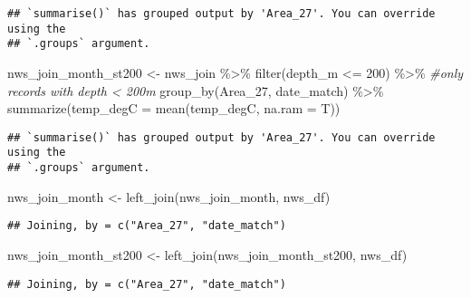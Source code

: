 \documentclass[
]{article}
\newenvironment{Shaded}{\begin{snugshade}}{\end{snugshade}}
\newcommand{\AttributeTok}[1]{\textcolor[rgb]{0.77,0.63,0.00}{#1}}
\newcommand{\CommentTok}[1]{\textcolor[rgb]{0.56,0.35,0.01}{\textit{#1}}}
\newcommand{\DecValTok}[1]{\textcolor[rgb]{0.00,0.00,0.81}{#1}}
\newcommand{\FunctionTok}[1]{\textcolor[rgb]{0.00,0.00,0.00}{#1}}
\newcommand{\NormalTok}[1]{#1}
\newcommand{\OtherTok}[1]{\textcolor[rgb]{0.56,0.35,0.01}{#1}}
\newcommand{\SpecialCharTok}[1]{\textcolor[rgb]{0.00,0.00,0.00}{#1}}
\begin{document}
\begin{verbatim}
## `summarise()` has grouped output by 'Area_27'. You can override using the
## `.groups` argument.
\end{verbatim}

\begin{Shaded}
\begin{Highlighting}[]
\NormalTok{nws\_join\_month\_st200 }\OtherTok{\textless{}{-}}\NormalTok{ nws\_join }\SpecialCharTok{\%\textgreater{}\%} 
  \FunctionTok{filter}\NormalTok{(depth\_m }\SpecialCharTok{\textless{}=} \DecValTok{200}\NormalTok{) }\SpecialCharTok{\%\textgreater{}\%} \CommentTok{\#only records with depth \textless{} 200m}
  \FunctionTok{group\_by}\NormalTok{(Area\_27, date\_match) }\SpecialCharTok{\%\textgreater{}\%} 
  \FunctionTok{summarize}\NormalTok{(}\AttributeTok{temp\_degC =} \FunctionTok{mean}\NormalTok{(temp\_degC, }\AttributeTok{na.ram =}\NormalTok{ T))}
\end{Highlighting}
\end{Shaded}

\begin{verbatim}
## `summarise()` has grouped output by 'Area_27'. You can override using the
## `.groups` argument.
\end{verbatim}

\begin{Shaded}
\begin{Highlighting}[]
\NormalTok{nws\_join\_month }\OtherTok{\textless{}{-}} \FunctionTok{left\_join}\NormalTok{(nws\_join\_month, nws\_df)}
\end{Highlighting}
\end{Shaded}

\begin{verbatim}
## Joining, by = c("Area_27", "date_match")
\end{verbatim}

\begin{Shaded}
\begin{Highlighting}[]
\NormalTok{nws\_join\_month\_st200 }\OtherTok{\textless{}{-}} \FunctionTok{left\_join}\NormalTok{(nws\_join\_month\_st200, nws\_df)}
\end{Highlighting}
\end{Shaded}

\begin{verbatim}
## Joining, by = c("Area_27", "date_match")
\end{verbatim}

\begin{Shaded}
\end{Shaded}
\end{document}
